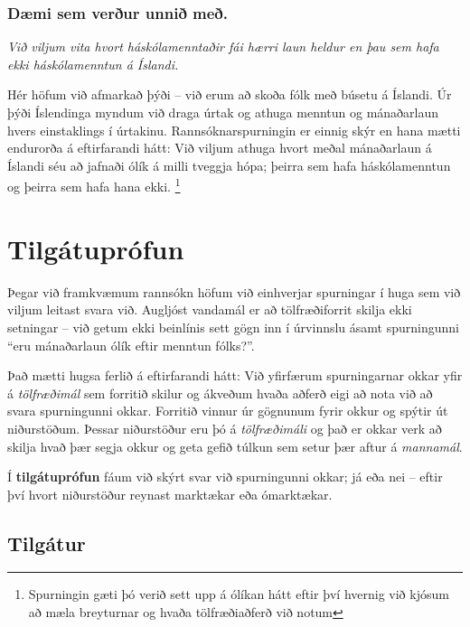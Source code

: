 \documentclass[
]{book}
\begin{document}
\hypertarget{duxe6mi-sem-veruxf0ur-unniuxf0-meuxf0.}{%
\subsection*{Dæmi sem verður unnið með.}\label{duxe6mi-sem-veruxf0ur-unniuxf0-meuxf0.}}

\emph{Við viljum vita hvort háskólamenntaðir fái hærri laun heldur en þau sem
hafa ekki háskólamenntun á Íslandi.}

Hér höfum við afmarkað þýði -- við erum að skoða fólk með búsetu á
Íslandi. Úr þýði Íslendinga myndum við draga úrtak og athuga menntun og
mánaðarlaun hvers einstaklings í úrtakinu. Rannsóknarspurningin er
einnig skýr en hana mætti endurorða á eftirfarandi hátt: Við viljum
athuga hvort meðal mánaðarlaun á Íslandi séu að jafnaði ólík á milli
tveggja hópa; þeirra sem hafa háskólamenntun og þeirra sem hafa hana
ekki. \footnote{Spurningin gæti þó verið sett upp á ólíkan hátt eftir því
  hvernig við kjósum að mæla breyturnar og hvaða tölfræðiaðferð við notum}

\hypertarget{tilguxe1tupruxf3fun}{%
\chapter{Tilgátuprófun}\label{tilguxe1tupruxf3fun}}

Þegar við framkvæmum rannsókn höfum við einhverjar spurningar í huga sem
við viljum leitast svara við. Augljóst vandamál er að tölfræðiforrit
skilja ekki setningar -- við getum ekki beinlínis sett gögn inn í
úrvinnslu ásamt spurningunni ``eru mánaðarlaun ólík eftir menntun
fólks?''.

Það mætti hugsa ferlið á eftirfarandi hátt: Við yfirfærum spurningarnar
okkar yfir á \emph{tölfræðimál} sem forritið skilur og ákveðum hvaða aðferð
eigi að nota við að svara spurningunni okkar. Forritið vinnur úr
gögnunum fyrir okkur og spýtir út niðurstöðum. Þessar niðurstöður eru þó
á \emph{tölfræðimáli} og það er okkar verk að skilja hvað þær segja okkur og
geta gefið túlkun sem setur þær aftur á \emph{mannamál}.

Í \textbf{tilgátuprófun} fáum við skýrt svar við spurningunni okkar; já eða
nei -- eftir því hvort niðurstöður reynast marktækar eða ómarktækar.

\hypertarget{cross}{%
\section{Tilgátur}\label{cross}}
\end{document}
